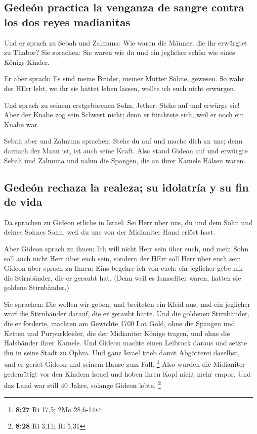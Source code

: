 \hypertarget{gedeuxf3n-practica-la-venganza-de-sangre-contra-los-dos-reyes-madianitas}{%
\subsection{Gedeón practica la venganza de sangre contra los dos reyes
madianitas}\label{gedeuxf3n-practica-la-venganza-de-sangre-contra-los-dos-reyes-madianitas}}

 Und er sprach zu Sebah und Zalmuna: Wie waren die
Männer, die ihr erwürgtet zu Thabor? Sie sprachen: Sie waren wie du und
ein jeglicher schön wie eines Königs Kinder.

 Er aber sprach: Es sind meine Brüder, meiner Mutter
Söhne, gewesen. So wahr der HErr lebt, wo ihr sie hättet leben lassen,
wollte ich euch nicht erwürgen.

 Und sprach zu seinem erstgeborenen Sohn, Jether: Stehe
auf und erwürge sie! Aber der Knabe zog sein Schwert nicht; denn er
fürchtete sich, weil er noch ein Knabe war.

 Sebah aber und Zalmuna sprachen: Stehe du auf und mache
dich an uns; denn darnach der Mann ist, ist auch seine Kraft. Also stand
Gideon auf und erwürgte Sebah und Zalmuna und nahm die Spangen, die an
ihrer Kamele Hälsen waren.

\hypertarget{gedeuxf3n-rechaza-la-realeza-su-idolatruxeda-y-su-fin-de-vida}{%
\subsection{Gedeón rechaza la realeza; su idolatría y su fin de
vida}\label{gedeuxf3n-rechaza-la-realeza-su-idolatruxeda-y-su-fin-de-vida}}

 Da sprachen zu Gideon etliche in Israel: Sei Herr über
uns, du und dein Sohn und deines Sohnes Sohn, weil du uns von der
Midianiter Hand erlöst hast.

 Aber Gideon sprach zu ihnen: Ich will nicht Herr sein
über euch, und mein Sohn soll auch nicht Herr über euch sein, sondern
der HErr soll Herr über euch sein.  Gideon aber sprach zu
Ihnen: Eins begehre ich von euch: ein jeglicher gebe mir die
Stirnbänder, die er geraubt hat. (Denn weil es Ismaeliter waren, hatten
sie goldene Stirnbänder.)

 Sie sprachen: Die wollen wir geben; und breiteten ein
Kleid aus, und ein jeglicher warf die Stirnbänder darauf, die er geraubt
hatte.  Und die goldenen Stirnbänder, die er forderte,
machten am Gewichte 1700 Lot Gold, ohne die Spangen und Ketten und
Purpurkleider, die der Midianiter Könige tragen, und ohne die Halsbänder
ihrer Kamele.  Und Gideon machte einen Leibrock daraus
und setzte ihn in seine Stadt zu Ophra. Und ganz Israel trieb damit
Abgötterei daselbst, und er geriet Gideon und seinem Hause zum Fall.
\footnote{\textbf{8:27} Ri 17,5; 2Mo 28,6-14}  Also
wurden die Midianiter gedemütigt vor den Kindern Israel und hoben ihren
Kopf nicht mehr empor. Und das Land war still 40 Jahre, solange Gideon
lebte. \footnote{\textbf{8:28} Ri 3,11; Ri 5,31}

